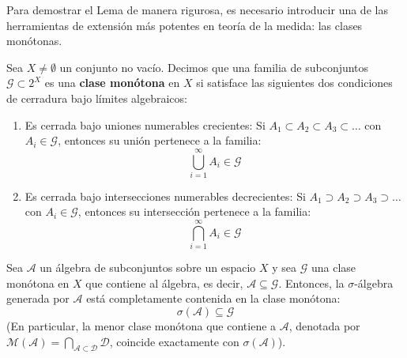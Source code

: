 Para demostrar el Lema de manera rigurosa, es necesario introducir una de las herramientas de extensión más potentes en teoría de la medida: las clases monótonas.



\begin{definicion}
	Sea $X \neq \emptyset$ un conjunto no vacío. Decimos que una familia de subconjuntos $\mathcal{G} \subset 2^X$ es una \textbf{clase monótona} en $X$ si satisface las siguientes dos condiciones de cerradura bajo límites algebraicos:
	\begin{enumerate}[1)]
		\item Es cerrada bajo uniones numerables crecientes: Si $A_1 \subset A_2 \subset A_3 \subset \dots$ con $A_i \in \mathcal{G}$, entonces su unión pertenece a la familia:
		$$ \bigcup_{i=1}^\infty A_i \in \mathcal{G} $$
		\item Es cerrada bajo intersecciones numerables decrecientes: Si $A_1 \supset A_2 \supset A_3 \supset \dots$ con $A_i \in \mathcal{G}$, entonces su intersección pertenece a la familia:
		$$ \bigcap_{i=1}^\infty A_i \in \mathcal{G} $$
	\end{enumerate}
\end{definicion}

\begin{teorema}
	Sea $\mathcal{A}$ un álgebra de subconjuntos sobre un espacio $X$ y sea $\mathcal{G}$ una clase monótona en $X$ que contiene al álgebra, es decir, $\mathcal{A} \subseteq \mathcal{G}$. Entonces, la $\sigma$-álgebra generada por $\mathcal{A}$ está completamente contenida en la clase monótona:
	$$ \sigma(\mathcal{A}) \subseteq \mathcal{G} $$
	(En particular, la menor clase monótona que contiene a $\mathcal{A}$, denotada por $\mathcal{M}(\mathcal{A}) = \bigcap_{\mathcal{A} \subset \mathcal{D}} \mathcal{D}$, coincide exactamente con $\sigma(\mathcal{A})$).
\end{teorema}

